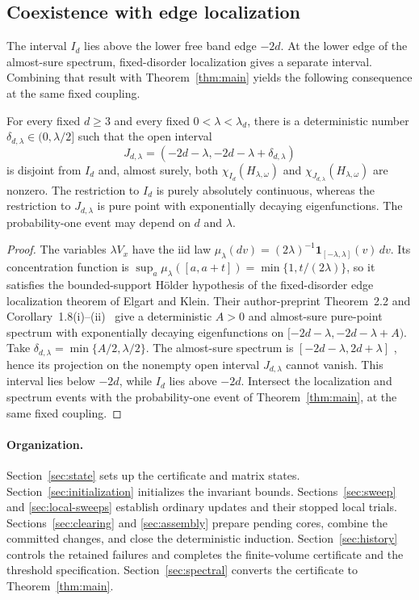 \subsection{Coexistence with edge localization}

The interval $I_d$ lies above the lower free band edge $-2d$.
At the lower edge of the almost-sure spectrum, fixed-disorder localization
gives a separate interval. Combining that result with
Theorem~\ref{thm:main} yields the following consequence at the same
fixed coupling.

\begin{corollary}\label{cor:coexistence}
For every fixed $d\ge3$ and every fixed $0<\lambda<\lambda_d$,
there is a deterministic number $\delta_{d,\lambda}\in(0,\lambda/2]$
such that the open interval
\[
 J_{d,\lambda}
 =(-2d-\lambda,-2d-\lambda+\delta_{d,\lambda})
\]
is disjoint from $I_d$ and, almost surely, both
$\chi_{I_d}(H_{\lambda,\omega})$ and
$\chi_{J_{d,\lambda}}(H_{\lambda,\omega})$ are nonzero.
The restriction to $I_d$ is purely absolutely continuous, whereas the
restriction to $J_{d,\lambda}$ is pure point with exponentially decaying
eigenfunctions. The probability-one event may depend on $d$ and $\lambda$.
\end{corollary}

\begin{proof}
The variables $\lambda V_x$ have the iid law
$\mu_\lambda(dv)=(2\lambda)^{-1}\mathbf1_{[-\lambda,\lambda]}(v)\,dv$.
Its concentration function is
$\sup_a\mu_\lambda([a,a+t])=\min\{1,t/(2\lambda)\}$, so it satisfies
the bounded-support H\"older hypothesis of the fixed-disorder edge
localization theorem of Elgart and Klein. Their author-preprint
Theorem~2.2 and Corollary~1.8(i)--(ii)~\cite{ElgartKlein2019}
give a deterministic $A>0$ and almost-sure pure-point spectrum with
exponentially decaying eigenfunctions on
$[-2d-\lambda,-2d-\lambda+A)$. Take
$\delta_{d,\lambda}=\min\{A/2,\lambda/2\}$.
The almost-sure spectrum is $[-2d-\lambda,2d+\lambda]$
\cite[author-preprint equation~(1.17)]{ElgartKlein2019}, hence its
projection on the nonempty open interval $J_{d,\lambda}$ cannot vanish.
This interval lies below $-2d$, while $I_d$ lies above $-2d$.
Intersect the localization and spectrum events with the probability-one
event of Theorem~\ref{thm:main}, at the same fixed coupling.
\end{proof}

\paragraph{Organization.}
Section~\ref{sec:state} sets up the certificate and matrix states.
Section~\ref{sec:initialization} initializes the invariant bounds.
Sections~\ref{sec:sweep} and \ref{sec:local-sweeps} establish ordinary
updates and their stopped local trials. Sections~\ref{sec:clearing}
and \ref{sec:assembly} prepare pending cores, combine the committed
changes, and close the deterministic induction.
Section~\ref{sec:history} controls the retained failures and completes
the finite-volume certificate and the threshold specification.
Section~\ref{sec:spectral} converts the certificate to
Theorem~\ref{thm:main}.
